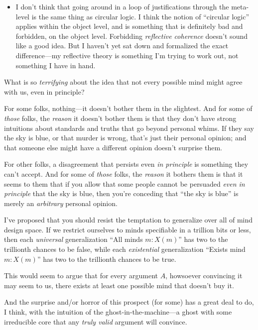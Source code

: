 \begin{itemize}
\item {
 I don't think that going around in a loop of
justifications through the meta-level is the same thing as circular
logic. I think the notion of ``circular
logic'' applies within the object level, and is
something that is definitely bad and forbidden, on the object level.
Forbidding \textit{reflective coherence} doesn't sound
like a good idea. But I haven't yet sat down and
formalized the exact difference---my reflective theory is something
I'm trying to work out, not something I have in hand.}
\end{itemize}

\myendsectiontext



 What is so \textit{terrifying} about the idea that not every
possible mind might agree with us, even in principle? 


 For some folks, nothing---it doesn't bother them
in the slightest. And for some of \textit{those} folks, the
\textit{reason} it doesn't bother them is that they
don't have strong intuitions about standards and truths
that go beyond personal whims. If they say the sky is blue, or that
murder is wrong, that's just their personal opinion;
and that someone else might have a different opinion
doesn't surprise them.


 For other folks, a disagreement that persists even \textit{in
principle} is something they can't accept. And for some
of \textit{those} folks, the \textit{reason} it bothers them is that it
seems to them that if you allow that some people cannot be persuaded
\textit{even in principle} that the sky is blue, then
you're conceding that ``the sky is
blue'' is merely an \textit{arbitrary} personal
opinion.


 I've proposed that you should resist the
temptation to generalize over all of mind design space. If we restrict
ourselves to minds specifiable in a trillion bits or less, then each
\textit{universal} generalization ``All minds $m:
X(m)$'' has two to the trillionth chances to be false,
while each \textit{existential} generalization
``Exists mind $m: X(m)$'' has two to
the trillionth chances to be true.


 This would seem to argue that for every argument $A$, howsoever
convincing it may seem to us, there exists at least one possible mind
that doesn't buy it.


 And the surprise and/or horror of this prospect (for some) has a
great deal to do, I think, with the intuition of the
ghost-in-the-machine---a ghost with some irreducible core that any
\textit{truly valid} argument will convince.


